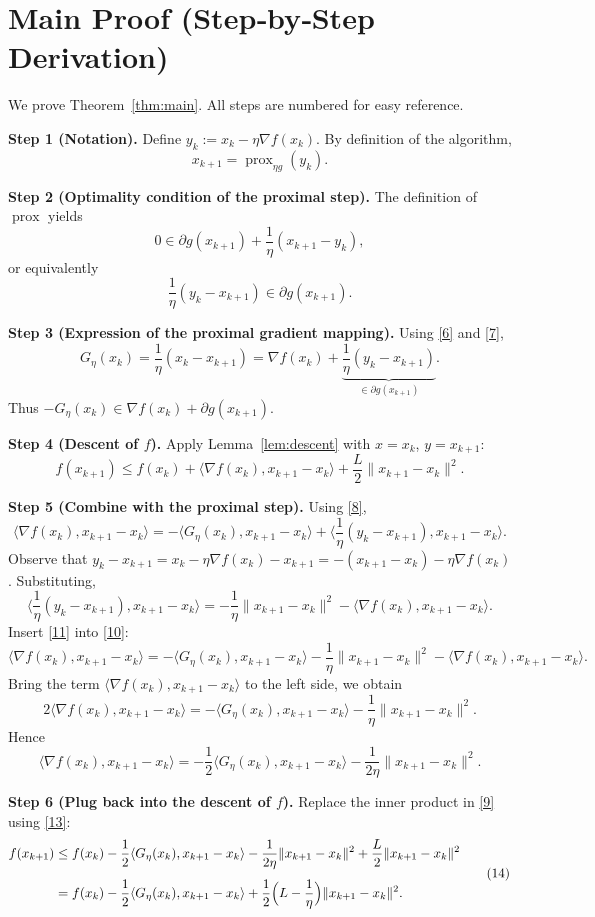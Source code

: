 \documentclass{article}
\newcommand{\prox}{\operatorname{prox}}
\newcommand{\grad}{\nabla}
\begin{document}
\section*{Main Proof (Step‑by‑Step Derivation)}
We prove Theorem~\ref{thm:main}. All steps are numbered for easy reference.

\medskip
\noindent\textbf{Step 1 (Notation).} Define $y_k:=x_k-\eta\grad f(x_k)$. By definition of the algorithm,
\[
x_{k+1}= \prox_{\eta g}(y_k). \tag{6}
\]

\noindent\textbf{Step 2 (Optimality condition of the proximal step).} The definition of $\prox$ yields
\[
0\in \partial g(x_{k+1})+\frac{1}{\eta}(x_{k+1}-y_k),
\]
or equivalently
\[
\frac{1}{\eta}(y_k-x_{k+1})\in \partial g(x_{k+1}). \tag{7}
\]

\noindent\textbf{Step 3 (Expression of the proximal gradient mapping).} Using \eqref{6} and \eqref{7},
\[
G_{\eta}(x_k)=\frac{1}{\eta}(x_k-x_{k+1})
               =\grad f(x_k)+\underbrace{\frac{1}{\eta}(y_k-x_{k+1})}_{\in\partial g(x_{k+1})}.
\tag{8}
\]
Thus $-G_{\eta}(x_k)\in \grad f(x_k)+\partial g(x_{k+1})$.

\noindent\textbf{Step 4 (Descent of $f$).} Apply Lemma~\ref{lem:descent} with $x=x_k$, $y=x_{k+1}$:
\[
f(x_{k+1})\le f(x_k)+\langle\grad f(x_k),x_{k+1}-x_k\rangle
               +\frac{L}{2}\|x_{k+1}-x_k\|^{2}. \tag{9}
\]

\noindent\textbf{Step 5 (Combine with the proximal step).} Using \eqref{8},
\[
\langle\grad f(x_k),x_{k+1}-x_k\rangle
= -\langle G_{\eta}(x_k),x_{k+1}-x_k\rangle
  +\Big\langle\frac{1}{\eta}(y_k-x_{k+1}),x_{k+1}-x_k\Big\rangle .
\tag{10}
\]
Observe that $y_k-x_{k+1}=x_k-\eta\grad f(x_k)-x_{k+1}=-(x_{k+1}-x_k)-\eta\grad f(x_k)$. Substituting,
\[
\Big\langle\frac{1}{\eta}(y_k-x_{k+1}),x_{k+1}-x_k\Big\rangle
= -\frac{1}{\eta}\|x_{k+1}-x_k\|^{2}
  -\langle\grad f(x_k),x_{k+1}-x_k\rangle .
\tag{11}
\]
Insert \eqref{11} into \eqref{10}:
\[
\langle\grad f(x_k),x_{k+1}-x_k\rangle
= -\langle G_{\eta}(x_k),x_{k+1}-x_k\rangle
   -\frac{1}{\eta}\|x_{k+1}-x_k\|^{2}
   -\langle\grad f(x_k),x_{k+1}-x_k\rangle .
\]
Bring the term $ \langle\grad f(x_k),x_{k+1}-x_k\rangle$ to the left side, we obtain
\[
2\langle\grad f(x_k),x_{k+1}-x_k\rangle
   = -\langle G_{\eta}(x_k),x_{k+1}-x_k\rangle
     -\frac{1}{\eta}\|x_{k+1}-x_k\|^{2}.
\tag{12}
\]
Hence
\[
\langle\grad f(x_k),x_{k+1}-x_k\rangle
   = -\frac{1}{2}\langle G_{\eta}(x_k),x_{k+1}-x_k\rangle
     -\frac{1}{2\eta}\|x_{k+1}-x_k\|^{2}.
\tag{13}
\]

\noindent\textbf{Step 6 (Plug back into the descent of $f$).} Replace the inner product in \eqref{9} using \eqref{13}:
\[
\begin{aligned}
f(x_{k+1}) &\le f(x_k)
            -\frac{1}{2}\langle G_{\eta}(x_k),x_{k+1}-x_k\rangle
            -\frac{1}{2\eta}\|x_{k+1}-x_k\|^{2}
            +\frac{L}{2}\|x_{k+1}-x_k\|^{2}\\[4pt]
          &= f(x_k)
            -\frac{1}{2}\langle G_{\eta}(x_k),x_{k+1}-x_k\rangle
            +\frac{1}{2}\Bigl(L-\frac{1}{\eta}\Bigr)\|x_{k+1}-x_k\|^{2}.
\end{aligned}
\tag{14}
\]
\end{document}
